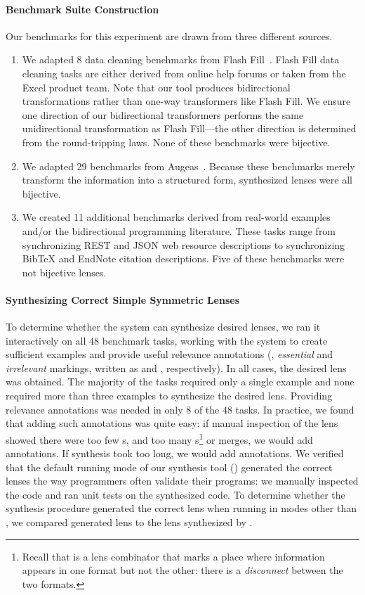 \documentclass[12pt]{article}
\begin{document}
{\paragraph*{Benchmark Suite Construction}
Our benchmarks for this experiment are drawn from three different sources.
\begin{enumerate}
\item We adapted 8 data cleaning benchmarks from Flash Fill~\cite{flashfill}. Flash Fill data
  cleaning tasks are either derived from online help forums or taken from the
  Excel product team. Note that our tool produces bidirectional transformations
  rather than one-way transformers like Flash Fill. We ensure one direction of
  our bidirectional transformers performs the same unidirectional transformation
  as Flash Fill---the other direction is determined from the round-tripping
  laws. None of these benchmarks were bijective.
\item We adapted 29 benchmarks from Augeas~\cite{augeas}. Because
  these benchmarks merely transform the information into a structured form,
  synthesized lenses were all bijective.
\item We created 11 additional benchmarks 
  derived from real-world examples and/or the bidirectional programming
  literature. These tasks range from synchronizing REST and JSON web resource
  descriptions to synchronizing BibTeX and EndNote citation descriptions. Five
  of these benchmarks were not bijective lenses.
\end{enumerate}

\paragraph*{Synthesizing Correct Simple Symmetric Lenses}

To determine whether the system can synthesize desired lenses, we ran
it interactively on all 48 benchmark tasks, working with the system to
create sufficient examples and provide useful relevance annotations
(\IE, \emph{essential} and \emph{irrelevant} markings, written as
\SRequire and \Skip, respectively).
In all cases, the desired lens was obtained.
%
The majority of the tasks required only a single example and none required
more than three examples to synthesize the desired lens.
%
Providing relevance annotations 
was needed in only 8 of the 48 tasks. In
practice, we found that adding such annotations was quite easy: if manual inspection
of the lens showed there were too few \IdentityLens{}s, and too many
\Disconnect{}s\footnote{
Recall that \Disconnect{} is a lens combinator that marks a place where
information appears in one format but not the 
other: there is a \emph{disconnect} between the two formats. 
}
  or merges, we would add \SRequire annotations. If synthesis took
too long, we would add \Skip annotations.
%
We verified that the default running mode of our synthesis tool
(\SSOpt{}) generated the 
correct lenses the way programmers often validate their programs: we
manually inspected the code and ran unit tests on the synthesized
code. To determine whether the synthesis procedure generated the
correct lens when running in modes other than \SSOpt{}, we compared
generated lens to the lens synthesized by \SSOpt{}.


}
\end{document}
